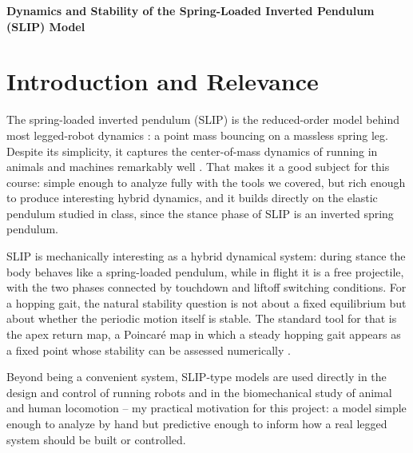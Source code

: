 \documentclass[11pt]{article}
\begin{document}
\begin{center}
    {\Large \textbf{Dynamics and Stability of the Spring-Loaded Inverted
    Pendulum (SLIP) Model}}\\[2pt]
\end{center}
\vspace{-4pt}

\section{Introduction and Relevance}

The spring-loaded inverted pendulum (SLIP) is the reduced-order model
behind most legged-robot dynamics \cite{full1999,saranli2001}: a point
mass bouncing on a massless spring leg. Despite its simplicity, it
captures the center-of-mass dynamics of running in animals and
machines remarkably well \cite{blickhan1989,mcmahon1990}. That makes it
a good subject for this course: simple enough to analyze fully with
the tools we covered, but rich enough to produce interesting hybrid
dynamics, and it builds directly on the elastic pendulum studied in
class, since the stance phase of SLIP is an inverted spring pendulum.

SLIP is mechanically interesting as a hybrid dynamical system: during
stance the body behaves like a spring-loaded pendulum, while in flight
it is a free projectile, with the two phases connected by touchdown
and liftoff switching conditions. For a hopping gait, the natural
stability question is not about a fixed equilibrium but about whether
the periodic motion itself is stable. The standard tool for that is
the apex return map, a Poincar\'e map in which a steady hopping gait
appears as a fixed point whose stability can be assessed numerically
\cite{blickhan1989,schwind2000}.

Beyond being a convenient system, SLIP-type models are used directly
in the design and control of running robots and in the biomechanical
study of animal and human locomotion -- my practical motivation for
this project: a model simple enough to analyze by hand but predictive
enough to inform how a real legged system should be built or
controlled.
\end{document}
